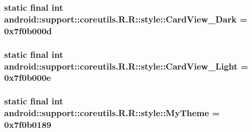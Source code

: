 \hypertarget{classandroid_1_1support_1_1coreutils_1_1_r_1_1style_6bf219ba56e1385ddf2a5f582c6fb9fa}{
\subsubsection[{CardView\_\-Dark}]{\setlength{\rightskip}{0pt plus 5cm}static final int android::support::coreutils.R.R::style::CardView\_\-Dark = 0x7f0b000d}}
\label{classandroid_1_1support_1_1coreutils_1_1_r_1_1style_6bf219ba56e1385ddf2a5f582c6fb9fa}


\hypertarget{classandroid_1_1support_1_1coreutils_1_1_r_1_1style_5efb20d0a414ed20792e25a0f40af8ab}{
\subsubsection[{CardView\_\-Light}]{\setlength{\rightskip}{0pt plus 5cm}static final int android::support::coreutils.R.R::style::CardView\_\-Light = 0x7f0b000e}}
\label{classandroid_1_1support_1_1coreutils_1_1_r_1_1style_5efb20d0a414ed20792e25a0f40af8ab}


\hypertarget{classandroid_1_1support_1_1coreutils_1_1_r_1_1style_1359e2e89eeceb11504e1ba2e33a0ac3}{
\subsubsection[{MyTheme}]{\setlength{\rightskip}{0pt plus 5cm}static final int android::support::coreutils.R.R::style::MyTheme = 0x7f0b0189}}
\label{classandroid_1_1support_1_1coreutils_1_1_r_1_1style_1359e2e89eeceb11504e1ba2e33a0ac3}


